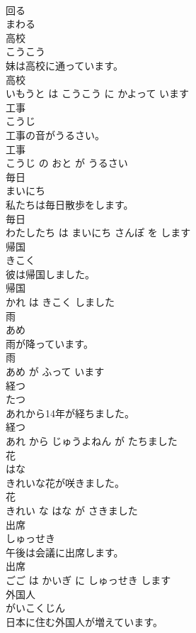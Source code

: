 \documentclass[8pt]{extreport}
\begin{document}
\begin{CJK}{UTF8}{min}
\\	回る	
\\	まわる			
\\	高校	
\\	こうこう			
\\	妹は高校に通っています。	
\\	高校 
\\	いもうと は こうこう に かよって います			
\\	工事	
\\	こうじ			
\\	工事の音がうるさい。	
\\	工事 
\\	こうじ の おと が うるさい			
\\	毎日	
\\	まいにち			
\\	私たちは毎日散歩をします。	
\\	毎日 
\\	わたしたち は まいにち さんぽ を します			
\\	帰国	
\\	きこく			
\\	彼は帰国しました。	
\\	帰国 
\\	かれ は きこく しました			
\\	雨	
\\	あめ			
\\	雨が降っています。	
\\	雨 
\\	あめ が ふって います			
\\	経つ	
\\	たつ			
\\	あれから14年が経ちました。	
\\	経つ 
\\	あれ から じゅうよねん が たちました			
\\	花	
\\	はな			
\\	きれいな花が咲きました。	
\\	花 
\\	きれい な はな が さきました			
\\	出席	
\\	しゅっせき			
\\	午後は会議に出席します。	
\\	出席 
\\	ごご は かいぎ に しゅっせき します			
\\	外国人	
\\	がいこくじん			
\\	日本に住む外国人が増えています。	

\end{CJK}
\end{document}
